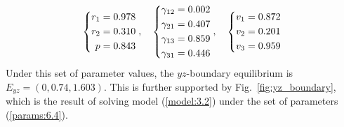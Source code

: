 \begin{equation}
    \begin{dcases}
        \begin{aligned}
            r_1 &= 0.978\\
            r_2 &= 0.310\\
            p &= 0.843
        \end{aligned}
    \end{dcases},\quad 
    \begin{dcases}
        \begin{aligned}
            \gamma_{12} &= 0.002\\
            \gamma_{21} &= 0.407\\
            \gamma_{13} &= 0.859\\
            \gamma_{31} &= 0.446
        \end{aligned}
    \end{dcases},\quad
    \begin{dcases}
        \begin{aligned}
            v_1 &= 0.872\\
            v_2 &= 0.201\\
            v_3 &= 0.959
        \end{aligned}
    \end{dcases} 
    \label{params:6.4}
\end{equation}
Under this set of parameter values, the $yz$-boundary equilibrium is $E_{yz}=(0,0.74,1.603)$. This is further supported by Fig.~\ref{fig:yz_boundary}, which is the result of solving model (\ref{model:3.2}) under the set of parameters (\ref{params:6.4}).

